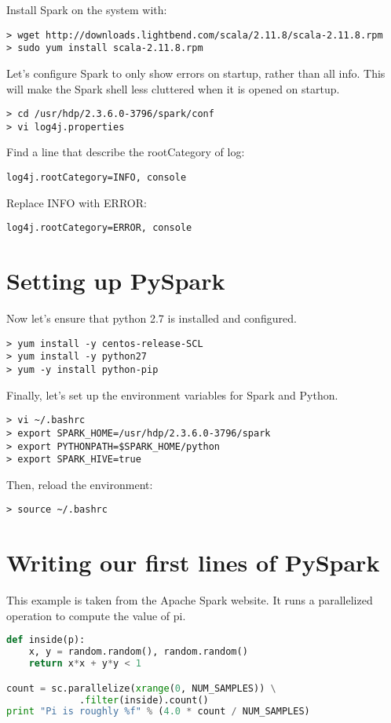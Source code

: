 \documentclass[9pt,twocolumn,twoside]{idsi}
\begin{document}
\noindent
Install Spark on the system with:
\begin{verbatim}
> wget http://downloads.lightbend.com/scala/2.11.8/scala-2.11.8.rpm
> sudo yum install scala-2.11.8.rpm
\end{verbatim}

\noindent
Let's configure Spark to only show errors on startup, rather than all info. This will make the Spark shell less cluttered when it is opened on startup.
\begin{verbatim}
> cd /usr/hdp/2.3.6.0-3796/spark/conf
> vi log4j.properties
\end{verbatim}

\noindent
Find a line that describe the rootCategory of log:
\begin{verbatim}
log4j.rootCategory=INFO, console
\end{verbatim}

Replace INFO with ERROR:
\begin{verbatim}
log4j.rootCategory=ERROR, console
\end{verbatim}

\section{Setting up PySpark}

Now let's ensure that python 2.7 is installed and configured.
\begin{verbatim}
> yum install -y centos-release-SCL
> yum install -y python27
> yum -y install python-pip
\end{verbatim}

\noindent
Finally, let's set up the environment variables for Spark and Python.
\begin{verbatim}
> vi ~/.bashrc
> export SPARK_HOME=/usr/hdp/2.3.6.0-3796/spark
> export PYTHONPATH=$SPARK_HOME/python
> export SPARK_HIVE=true
\end{verbatim}

\noindent
Then, reload the environment:
\begin{verbatim}
> source ~/.bashrc
\end{verbatim}

\section{Writing our first lines of PySpark}

This example is taken from the Apache Spark website. It runs a parallelized operation to compute the value of pi.
\begin{lstlisting}[language=python]
def inside(p):
    x, y = random.random(), random.random()
    return x*x + y*y < 1

count = sc.parallelize(xrange(0, NUM_SAMPLES)) \
             .filter(inside).count()
print "Pi is roughly %f" % (4.0 * count / NUM_SAMPLES)
\end{lstlisting}
\end{document}
